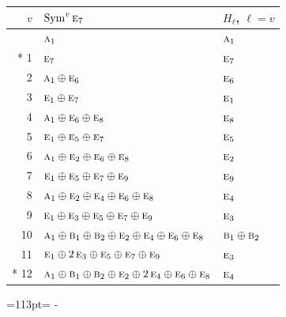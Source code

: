 \documentclass[10pt,a4paper]{article}
\newcommand{\needspace}[1]{\par\penalty-100\begingroup\dimen0=#1\relax\dimen2=\pagegoal
  \advance\dimen2-\pagetotal\ifdim\dimen0>\dimen2\relax\ifdim\dimen2>0pt\vfil\break\fi\fi
  \endgroup}
\numberwithin{equation}{section}
\newcommand{\irr}[1]{\text{\normalfont\scshape #1}}
\begin{document}
{\small\begin{longtable}{@{}rll@{}}\toprule
$v$ & $\operatorname{Sym}^{v}\irr{e}_{7}$ & $H_\ell$, $\ell = v$\\\midrule\endhead
\bottomrule\endfoot\endlastfoot
0 & $\irr{a}_{1}$ & $\irr{a}_{1}$\\*
1 & $\irr{e}_{7}$ & $\irr{e}_{7}$\\
2 & $\irr{a}_{1} \oplus \irr{e}_{6}$ & $\irr{e}_{6}$\\
3 & $\irr{e}_{1} \oplus \irr{e}_{7}$ & $\irr{e}_{1}$\\
4 & $\irr{a}_{1} \oplus \irr{e}_{6} \oplus \irr{e}_{8}$ & $\irr{e}_{8}$\\
5 & $\irr{e}_{1} \oplus \irr{e}_{5} \oplus \irr{e}_{7}$ & $\irr{e}_{5}$\\
6 & $\irr{a}_{1} \oplus \irr{e}_{2} \oplus \irr{e}_{6} \oplus \irr{e}_{8}$ & $\irr{e}_{2}$\\
7 & $\irr{e}_{1} \oplus \irr{e}_{5} \oplus \irr{e}_{7} \oplus \irr{e}_{9}$ & $\irr{e}_{9}$\\
8 & $\irr{a}_{1} \oplus \irr{e}_{2} \oplus \irr{e}_{4} \oplus \irr{e}_{6} \oplus \irr{e}_{8}$ & $\irr{e}_{4}$\\
9 & $\irr{e}_{1} \oplus \irr{e}_{3} \oplus \irr{e}_{5} \oplus \irr{e}_{7} \oplus \irr{e}_{9}$ & $\irr{e}_{3}$\\
10 & $\irr{a}_{1} \oplus \irr{b}_{1} \oplus \irr{b}_{2} \oplus \irr{e}_{2} \oplus \irr{e}_{4} \oplus \irr{e}_{6} \oplus \irr{e}_{8}$ & $\irr{b}_{1} \oplus \irr{b}_{2}$\\
11 & $\irr{e}_{1} \oplus 2\,\irr{e}_{3} \oplus \irr{e}_{5} \oplus \irr{e}_{7} \oplus \irr{e}_{9}$ & $\irr{e}_{3}$\\*
12 & $\irr{a}_{1} \oplus \irr{b}_{1} \oplus \irr{b}_{2} \oplus \irr{e}_{2} \oplus 2\,\irr{e}_{4} \oplus \irr{e}_{6} \oplus \irr{e}_{8}$ & $\irr{e}_{4}$\\
\bottomrule\end{longtable}}
\needspace{113pt}
\end{document}
